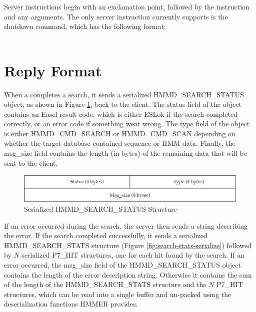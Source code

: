 \documentclass[notoc,justified,openany]{tufte-book}    %
\newcommand{\hmmserver}{\mono{hmmserver}\xspace}
\begin{document}
Server instructions begin with an exclamation point, followed by the instruction and any arguments.  The only server instruction \hmmserver currently supports is the shutdown command, which has the following format:\\
\vspace{1ex}
\\
\vspace{1ex}

\section{Reply Format}
When a \hmmserver completes a search, it sends a serialized {HMMD\_SEARCH\_STATUS} object, as shown in Figure \ref{fig:search-status-serialize}, back to the client.  The status field of the object contains an Easel result code, which is either {ESLok} if the search completed correctly, or an error code if something went wrong.  The type field of the object is either {HMMD\_CMD\_SEARCH} or {HMMD\_CMD\_SCAN} depending on whether the target database contained sequence or HMM data.  Finally, the msg\_size field contains the length (in bytes) of the remaining data that will be sent to the client.

  \begin{figure}
    \includegraphics[width=\textwidth]{inclusions/HMMD_SEARCH_STATUS.pdf}
    \caption{Serialized {HMMD\_SEARCH\_STATUS} Structure}
    \label{fig:search-status-serialize}
    \end{figure} 

If an error occurred during the search, the server then sends a string describing the error.  If the search completed successfully, it sends a serialized {HMMD\_SEARCH\_STATS} structure (Figure \ref{fig:search-stats-serialize}) followed by $N$ serialized {P7\_HIT} structures, one for each hit found by the search.  If an error occurred, the msg\_size field of the {HMMD\_SEARCH\_STATUS} object contains the length of the error description string.  Otherwise it contains the sum of the length of the {HMMD\_SEARCH\_STATS} structure and the $N$ {P7\_HIT} structures, which can be read into a single buffer and un-packed using the deserialization functions HMMER provides.
\end{document}
